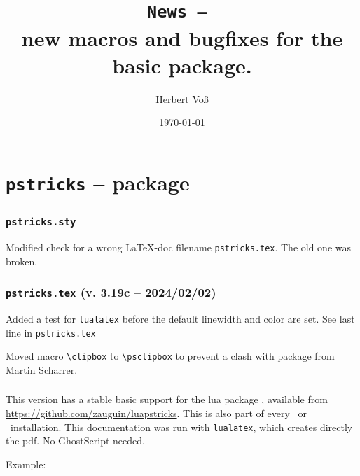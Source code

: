 \documentclass[11pt,english,BCOR=10mm,DIV=12,bibliography=totoc,parskip=false,headings=small,
    headinclude=false,footinclude=false,twoside,usegeometry,dvipsnames]{pst-doc}
\def\Lcs#1{\texttt{\textbackslash#1}}
\begin{document}
\title{\texttt{News -- \the\year}\\ \Large new macros and bugfixes for the basic package.}
\author{Herbert Voß}
\date{\today}

\settitle

\tableofcontents

\part{\texttt{pstricks} -- package}

\section{\texttt{pstricks.sty}}
Modified check for a wrong \LaTeX-doc filename \texttt{pstricks.tex}. The old one was
broken.


\section{\texttt{pstricks.tex} (v. 3.19c -- 2024/02/02)}

Added a test for \verb|lualatex| before the default linewidth and color are set.
See last line in \verb|pstricks.tex|

Moved macro \Lcs{clipbox} to \Lcs{psclipbox} to prevent a clash with package
from Martin Scharrer.



\section{\LuaLaTeX}\label{lua}
This version has a stable basic support for the lua package
, available from \url{https://github.com/zauguin/luapstricks}.
This is also part of every \MiKTeX\ or \TeXLive\ installation.  This documentation was
run with \verb|lualatex|, which creates directly the pdf. No GhostScript needed.

Example:
\end{document}
